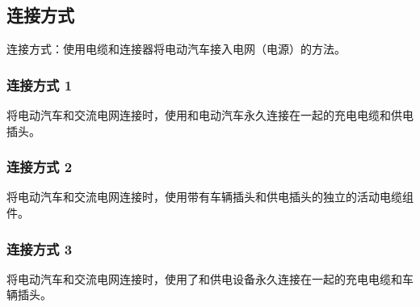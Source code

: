 	\subsection{连接方式}
		连接方式：使用电缆和连接器将电动汽车接入电网（电源）的方法。
		\subsubsection*{连接方式 1}
			将电动汽车和交流电网连接时，使用和电动汽车永久连接在一起的充电电缆和供电插头。
		\subsubsection*{连接方式 2}
			将电动汽车和交流电网连接时，使用带有车辆插头和供电插头的独立的活动电缆组件。
		\subsubsection*{连接方式 3}
			将电动汽车和交流电网连接时，使用了和供电设备永久连接在一起的充电电缆和车辆插头。








